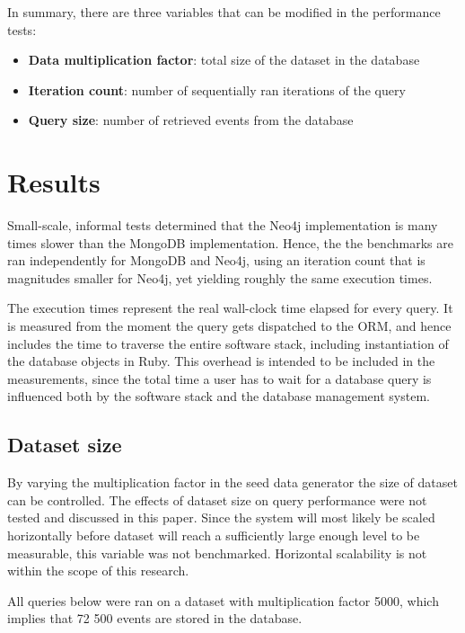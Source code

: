 In summary, there are three variables that can be modified in the performance tests:

\begin{itemize}
  \item \textbf{Data multiplication factor}: total size of the dataset in the database
  \item \textbf{Iteration count}: number of sequentially ran iterations of the query
  \item \textbf{Query size}: number of retrieved events from the database
\end{itemize}

\section{Results}
\label{sec:results}

Small-scale, informal tests determined that the Neo4j implementation is many times slower than the MongoDB implementation.
Hence, the the benchmarks are ran independently for MongoDB and Neo4j, using an iteration count that is magnitudes smaller for Neo4j, yet yielding roughly the same execution times.

The execution times represent the real wall-clock time elapsed for every query.
It is measured from the moment the query gets dispatched to the ORM, and hence includes the time to traverse the entire software stack, including instantiation of the database objects in Ruby.
This overhead is intended to be included in the measurements, since the total time a user has to wait for a database query is influenced both by the software stack and the database management system.

\subsection{Dataset size}
\label{subsec:dataset-size}

By varying the multiplication factor in the seed data generator the size of dataset can be controlled.
The effects of dataset size on query performance were not tested and discussed in this paper.
Since the system will most likely be scaled horizontally before dataset will reach a sufficiently large enough level to be measurable, this variable was not benchmarked.
Horizontal scalability is not within the scope of this research.

All queries below were ran on a dataset with multiplication factor 5000, which implies that 72 500 events are stored in the database.

